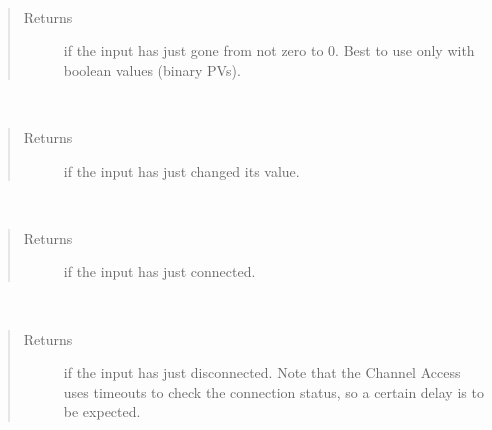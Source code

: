 \documentclass[letterpaper,10pt,english]{sphinxmanual}
\begin{document}

\begin{fulllineitems}
\label{\detokenize{io:falling}}~\begin{quote}\begin{description}
\item[{Returns}] \leavevmode
{} if the input has just gone from not zero to 0. Best to use only with boolean values (binary PVs).

\end{description}\end{quote}

\end{fulllineitems}


\begin{fulllineitems}
\label{\detokenize{io:changing}}~\begin{quote}\begin{description}
\item[{Returns}] \leavevmode
{} if the input has just changed its value.

\end{description}\end{quote}

\end{fulllineitems}


\begin{fulllineitems}
\label{\detokenize{io:connecting}}~\begin{quote}\begin{description}
\item[{Returns}] \leavevmode
{} if the input has just connected.

\end{description}\end{quote}

\end{fulllineitems}


\begin{fulllineitems}
\label{\detokenize{io:disconnecting}}~\begin{quote}\begin{description}
\item[{Returns}] \leavevmode
{} if the input has just disconnected. Note that the Channel Access uses timeouts to check the connection status, so a certain delay is to be expected.

\end{description}\end{quote}

\end{fulllineitems}
\end{document}
